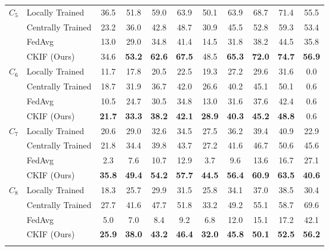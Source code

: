 \begin{table}[b]
\begin{tabular}{llcccc|cccc|c}
    $C_5$ & Locally Trained   & 36.5 & 51.8 & 59.0 & 63.9 & 50.1 & 63.9 & 68.7 & 71.4 & 55.5  \\
                   & Centrally Trained & 23.2 & 36.0 & 42.8 & 48.7 & 30.9 & 45.5 & 52.8 & 59.3 & 53.4  \\
                   & FedAvg   & 13.0 & 29.0 & 34.8 & 41.4 & 14.5 & 31.8 & 38.2 & 44.5 & 35.8  \\
                   & CKIF (Ours)   & 34.6 & \textbf{53.2} & \textbf{62.6} & \textbf{67.5} & 48.5 & \textbf{65.3} & \textbf{72.0} & \textbf{74.7} & \textbf{56.9}   \\
    \midrule
    $C_6$ & Locally Trained   & 11.7 & 17.8 & 20.5 & 22.5 & 19.3 & 27.2 & 29.6 & 31.6 & 0.0  \\
                   & Centrally Trained & 18.7 & 31.9 & 36.7 & 42.0 & 26.6 & 40.2 & 45.1 & 50.1 & 0.6  \\
                   & FedAvg   & 10.5 & 24.7 & 30.5 & 34.8 & 13.0 & 31.6 & 37.6 & 42.4 & 0.6  \\
                   & CKIF (Ours)     & \textbf{21.7} & \textbf{33.3} & \textbf{38.2} & \textbf{42.1} & \textbf{28.9} & \textbf{40.3} & \textbf{45.2} & \textbf{48.8} & 0.6   \\
    \midrule
    $C_7$ & Locally Trained   & 20.6 & 29.0 & 32.6 & 34.5 & 27.5 & 36.2 & 39.4 & 40.9 & 22.9  \\
                   & Centrally Trained & 21.8 & 34.4 & 39.8 & 43.7 & 27.2 & 41.6 & 46.7 & 50.6 & 45.6  \\
                   & FedAvg   & 2.3 & 7.6 & 10.7 & 12.9 & 3.7 & 9.6 & 13.6 & 16.7 & 27.1  \\
                   & CKIF (Ours)     & \textbf{35.8} & \textbf{49.4} & \textbf{54.2} & \textbf{57.7} & \textbf{44.5} & \textbf{56.4} & \textbf{60.9} & \textbf{63.5} & \textbf{40.6}   \\
    \midrule
    $C_8$ & Locally Trained   & 18.3 & 25.7 & 29.9 & 31.5 & 25.8 & 34.1 & 37.0 & 38.5 & 30.4  \\
                   & Centrally Trained & 27.7 & 41.6 & 47.7 & 51.8 & 33.2 & 49.2 & 55.1 & 58.7 & 69.6  \\
                   & FedAvg   & 5.0 & 7.0 & 8.4 & 9.2 & 6.8 & 12.0 & 15.1 & 17.2 & 42.1  \\
                   & CKIF (Ours)     & \textbf{25.9} & \textbf{38.0} & \textbf{43.2} & \textbf{46.4} & \textbf{32.0} & \textbf{45.8} & \textbf{50.1} & \textbf{52.5} & \textbf{56.2}   \\
    
    \botrule
    \end{tabular}
\end{table}
